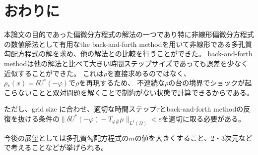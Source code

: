 \chapter{おわりに} \label{ch:conclusion}
本論文の目的であった偏微分方程式の解法の一つであり特に非線形偏微分方程式の数値解法として有用なthe back-and-forth methodを用いて非線形である多孔質勾配方程式の解を求め、他の解法との比較を行うことができた。
back-and-forth methodは他の解法と比べて大きい時間ステップサイズであっても誤差を少なく近似することができた。
これは$\rho$を直接求めるのではなく、$\rho_*(x) = \delta U^*(- \varphi)$で$\rho$を再現するため、
不連続な$\rho$の台の境界でショックが起こらないことと双対問題を解くことで制約がない状態で計算できるからである。

ただし、grid size に合わせ、適切な時間ステップ$\tau$とback-and-forth methodの反復を抜ける条件の$\|\delta U^*(- \varphi) - T_{\varphi \#} \mu \|_{L^1(\Omega)} < \varepsilon$を適切に取る必要がある。

今後の展望としては多孔質勾配方程式の$m$の値を大きくすること、2・3次元などで考えることなどが挙げられる。